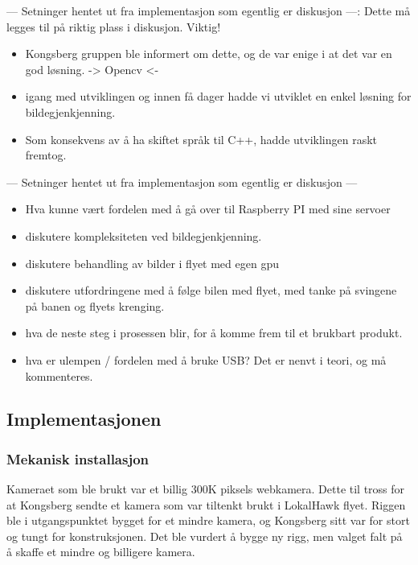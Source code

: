 --- Setninger hentet ut fra implementasjon som egentlig er diskusjon ---: Dette må legges til på riktig plass i diskusjon. Viktig!
\begin{itemize}
\item Kongsberg gruppen ble informert om dette, og de var enige i at det var en god løsning. -> Opencv <-
\item igang med utviklingen og innen få dager hadde vi utviklet en enkel løsning for bildegjenkjenning.
\item Som konsekvens av å ha skiftet språk til C++, hadde utviklingen raskt fremtog. 

\end {itemize}
--- Setninger hentet ut fra implementasjon som egentlig er diskusjon ---

\begin{itemize}
\item 
Hva kunne vært fordelen med å gå over til Raspberry PI med sine servoer

\item diskutere kompleksiteten ved bildegjenkjenning. 

\item diskutere behandling av bilder i flyet med egen gpu

\item diskutere utfordringene med å følge bilen med flyet, med tanke på svingene på banen og flyets krenging.

\item hva de neste steg i prosessen blir, for å komme frem til et brukbart produkt. 

\item hva er ulempen / fordelen med å bruke USB? Det er nenvt i teori, og må kommenteres. 
\end{itemize}

\subsection{Implementasjonen}
 
\subsubsection{Mekanisk installasjon}

Kameraet som ble brukt var et billig 300K piksels webkamera. Dette til tross for at Kongsberg sendte et kamera som var tiltenkt brukt i LokalHawk flyet. Riggen ble i utgangspunktet bygget for et mindre kamera, og Kongsberg sitt var for stort og tungt for konstruksjonen. Det ble vurdert å bygge ny rigg, men valget falt på å skaffe et mindre og billigere kamera. 

